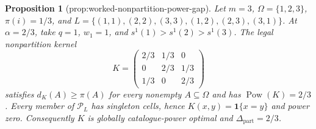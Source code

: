 \documentclass{article}
\newtheorem{proposition}{Proposition}
\begin{document}
\begin{proposition}[prop:worked-nonpartition-power-gap]\label{prop:worked-nonpartition-power-gap}
Let \(m=3\), \(\Omega=\{1,2,3\}\), \(\pi(i)=1/3\), and \(L=\{(1,1),(2,2),(3,3),(1,2),(2,3),(3,1)\}\). At \(\alpha=2/3\), take \(q=1\), \(w_1=1\), and \(s^1(1)>s^1(2)>s^1(3)\). The legal nonpartition kernel \[K=\begin{pmatrix}2/3&1/3&0\\0&2/3&1/3\\1/3&0&2/3\end{pmatrix}\] satisfies \(d_K(A)\geq\pi(A)\) for every nonempty \(A\subseteq\Omega\) and has \(\operatorname{Pow}(K)=2/3\). Every member of \(\mathcal{P}_L\) has singleton cells, hence \(K(x,y)=\mathbf{1}\{x=y\}\) and power zero. Consequently \(K\) is globally catalogue-power optimal and \(\Delta_{\mathrm{part}}=2/3\).
\end{proposition}
\end{document}
